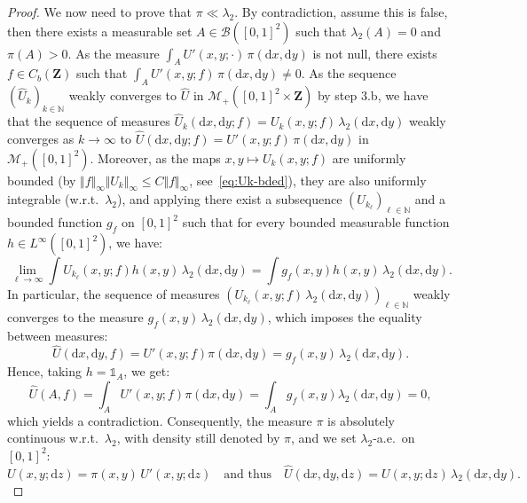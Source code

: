 \documentclass{amsart}
\newcommand{\wrt}{w.r.t.\ }
\newcommand{\aE}{a.e.\ }
\theoremstyle{plain}
\theoremstyle{definition}
\newcommand{\Space}{\mathbf{Z}}
\newcommand{\BorelX}[1]{\mathcal{B}(#1)}
\newcommand{\MeasX}[1]{\mathcal{M}_+(#1)}
\newcommand{\CbFunct}{C_b(\Space)}
\newcommand{\ind}{\mathds{1}}
\newcommand{\N}{\mathbb{N}}
\newcommand{\drv}{\mathrm{d}}
\newcommand{\rd}{\mathrm{d}}
\newcommand{\norm}[1]{\Vert#1\Vert}
\begin{document}
\begin{proof}
We now need to prove that $\pi \ll \lambda_2$.
By contradiction, assume this is false,
then there exists a measurable set $A\in \BorelX{[0,1]^2}$
	such that $\lambda_2(A) = 0$ and $\pi(A)>0$.
As the measure $\int_A U'(x,y;\cdot)\, \pi(\drv x, \drv y)$ is not null,
	there exists $f\in\CbFunct$ such that 
		$\int_A U'(x,y;f)\, \pi(\drv x, \drv y) \neq 0$.
As the sequence $(\hat U_k)_{k\in\N}$ weakly converges to $\hat U$ 
	in $\MeasX{[0,1]^2\times \Space}$ by step 3.b,
we have that the sequence of measures 
$\hat U_k(\drv x,\drv y; f) = U_k(x,y;f)\, \lambda_2(\drv x, \drv y)$
weakly converges as $k\to\infty$  to 
$\hat U(\drv x,\drv y; f) = U'(x,y;f)\, \pi(\drv x, \drv y)$
in $\MeasX{[0,1]^2}$.
Moreover, as the maps $x,y \mapsto U_k(x,y;f)$ are uniformly bounded 
(by $\norm{f}_\infty \norm{U_k}_\infty \leq C \norm{f}_\infty$, see~\eqref{eq:Uk-bded}),
they are also uniformly integrable (\wrt $\lambda_2$),
and applying \cite[Corollary 4.7.19]{BogachevMT1}
there exist a subsequence $(U_{k_\ell})_{\ell\in\N}$ and
a bounded function $g_f$ on $[0,1]^2$
such that for every bounded measurable function $h\in L^\infty([0,1]^2)$, we have:
\[ \lim_{\ell\to\infty} \int U_{k_\ell}(x,y;f) h(x,y)\, \lambda_2(\drv x, \drv y)
	= \int g_f(x,y)  h(x,y)\, \lambda_2(\drv x, \drv y) .\]
In particular, the sequence of measures
	$( U_{k_\ell}(x,y;f) \, \lambda_2(\drv x, \drv y) )_{\ell\in\N}$
	weakly converges to the measure 
		$g_f(x,y)\, \lambda_2(\drv x, \drv y)$,
	which imposes the equality between measures:
		\[ \hat U(\drv x,\drv y, f) = U'(x,y;f) \pi(\drv x, \drv y) 
				= g_f(x,y)\, \lambda_2(\drv x, \drv y) . \]
Hence, taking $h = \ind_A$, we get:
\[
\hat U(A, f) = \int_A U'(x,y;f) \pi(\drv x, \drv y)
= \int_A g_f(x,y) \lambda_2(\drv x, \drv y) = 0 ,
\]
	which yields a contradiction.
Consequently, 
the measure $\pi$ 
is absolutely continuous  \wrt $\lambda_2$, with
density  still  denoted  by  $\pi$,  and  we  set  $\lambda_2$-\aE  on
$[0,1]^2$:
\begin{equation}
   \label{eq:hatU=U-Leb}
  U(x,y; \rd z)=\pi(x,y)\,  U'(x,y;\rd z)
  \quad\text{and thus}\quad
 \hat U(\drv x,\drv y , \drv z) = U(x,y;\drv z)\, \lambda_2(\drv x,\drv y).
\end{equation}

\medskip


\end{proof}
\end{document}
